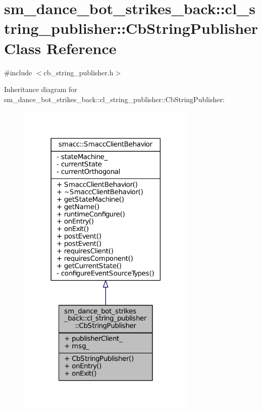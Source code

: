 \hypertarget{classsm__dance__bot__strikes__back_1_1cl__string__publisher_1_1CbStringPublisher}{}\section{sm\+\_\+dance\+\_\+bot\+\_\+strikes\+\_\+back\+:\+:cl\+\_\+string\+\_\+publisher\+:\+:Cb\+String\+Publisher Class Reference}
\label{classsm__dance__bot__strikes__back_1_1cl__string__publisher_1_1CbStringPublisher}


{\ttfamily \#include $<$cb\+\_\+string\+\_\+publisher.\+h$>$}



Inheritance diagram for sm\+\_\+dance\+\_\+bot\+\_\+strikes\+\_\+back\+:\+:cl\+\_\+string\+\_\+publisher\+:\+:Cb\+String\+Publisher\+:
\nopagebreak
\begin{figure}[H]
\begin{center}
\leavevmode
\includegraphics[width=242pt]{classsm__dance__bot__strikes__back_1_1cl__string__publisher_1_1CbStringPublisher__inherit__graph}
\end{center}
\end{figure}


